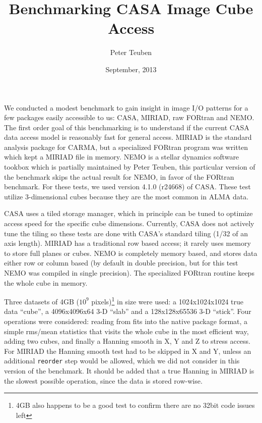 \documentclass{article}
\title{Benchmarking CASA Image Cube Access}
\author{Peter Teuben}
\date{September, 2013}
\begin{document}
\maketitle


We conducted a modest benchmark to gain insight in image I/O patterns
for a few packages easily accessible to us: CASA, MIRIAD, raw FORtran
and NEMO. The first order goal of this benchmarking is to understand
if the current CASA data access model is reasonably fast for general
access.  MIRIAD is the standard analysis package for CARMA, but a
specialized FORtran program was written which kept a MIRIAD file in
memory.  NEMO is a stellar dynamics software tookbox which is
partially maintained by Peter Teuben, this particular version
of the benchmark skips the actual result for NEMO, in favor of the 
FORtran benchmark.  For these tests, we used version
4.1.0 (r24668) of CASA. These test utilize 3-dimensional cubes because
they are the most common in ALMA data.

CASA uses a tiled storage manager, which in principle can be tuned to
optimize access speed for the specific cube dimensions.  Currently,
CASA does not actively tune the tiling so these tests are done with
CASA's standard tiling (1/32 of an axis length).  MIRIAD has a
traditional row based access; it rarely uses memory to store full
planes or cubes. NEMO is completely memory based, and stores data
either row or column based (by default in double precision, but for
this test NEMO was compiled in single precision). The specialized
FORtran routine keeps the whole cube in memory.

Three datasets of 4GB ($10^9$ pixels)\footnote{4GB also happens to
be a good test to confirm there are no 32bit code issues left}
in size were used:
a 1024x1024x1024 true data ``cube'',
a 4096x4096x64 3-D ``slab'' and a 128x128x65536 3-D ``stick''.
Four operations were considered:  reading from fits
into the native package format,
a simple rms/mean statistics that visits the whole cube in the
most efficient way, adding two cubes, and finally
a Hanning smooth in X, Y and Z to stress access.
For MIRIAD
the Hanning smooth test had to be skipped in X and Y, unless
an additional {\tt reorder} step would be allowed, which we did
not consider in this version of the benchmark.
It should be added that a true Hanning in MIRIAD
is the slowest possible operation, since the data is stored
row-wise.
\end{document}
